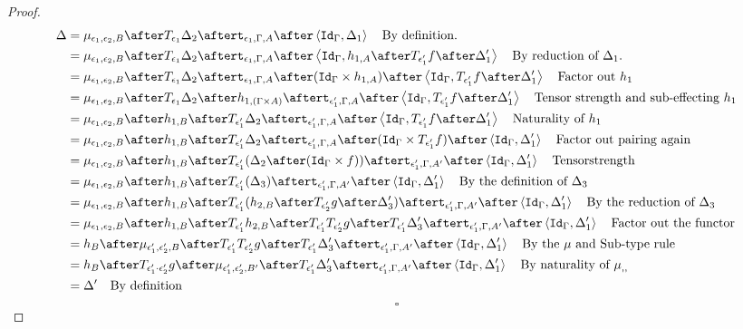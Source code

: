 \documentclass{Report}
\begin{document}
\begin{proof}
    \begin{align}
        \D &= \bind{\e_1}{\e_2}{B}\after \T{\e_1}{\D_2}\after\tstrength{\e_1}{\G}{A}\after\pr{\idg}{\D_1}\qt{By definition.}\\
        &= \bind{\e_1}{\e_2}{B}\after \T{\e_1}{\D_2}\after\tstrength{\e_1}{\G}{A}\after\pr{\idg}{h_{1, A}\after\T{\e_1'}{f}\after\D_1'}\qt{By reduction of $\D_1$.}\\
        &= \bind{\e_1}{\e_2}{B}\after \T{\e_1}{\D_2}\after\tstrength{\e_1}{\G}{A}\after(\idg\times h_{1, A})\after\pr{\idg}{\T{\e_1'}{f}\after\D_1'}\qt{Factor out $h_1$}\\
        &= \bind{\e_1}{\e_2}{B}\after \T{\e_1}{\D_2}\after
        h_{1, (\G\times A)}\after
        \tstrength{\e_1'}{\G}{A}\after\pr{\idg}{\T{\e_1'}{f}\after\D_1'}\qt{Tensor strength and sub-effecting $h_1$}\\
        &= \bind{\e_1}{\e_2}{B}\after 
        h_{1, B}\after\T{\e_1'}{\D_2}\after
        \tstrength{\e_1'}{\G}{A}\after\pr{\idg}{\T{\e_1'}{f}\after\D_1'}\qt{Naturality of $h_1$}\\
        &= \bind{\e_1}{\e_2}{B}\after 
        h_{1, B}\after\T{\e_1'}{\D_2}\after
        \tstrength{\e_1'}{\G}{A}\after(\idg\times \T{\e_1'}{f})\after\pr{\idg}{\D_1'}\qt{Factor out pairing again}\\
        &= \bind{\e_1}{\e_2}{B}\after 
        h_{1, B}\after\T{\e_1'}{(\D_2\after(\idg\times f))}\after
        \tstrength{\e_1'}{\G}{A'}\after\pr{\idg}{\D_1'}\qt{Tensorstrength}\\
        &= \bind{\e_1}{\e_2}{B}\after 
        h_{1, B}\after\T{\e_1'}{(\D_3)}\after
        \tstrength{\e_1'}{\G}{A'}\after\pr{\idg}{\D_1'}\qt{By the definition of $\D_3$}\\
        &= \bind{\e_1}{\e_2}{B}\after 
        h_{1, B}\after\T{\e_1'}{(h_{2, B}\after\T{\e_2'}{g}\after \D_3')}\after
        \tstrength{\e_1'}{\G}{A'}\after\pr{\idg}{\D_1'}\qt{By the reduction of $\D_3$}\\
        &= \bind{\e_1}{\e_2}{B}\after 
        h_{1, B}\after\T{\e_1'}{h_{2, B}}\after\T{\e_1'}{\T{\e_2'}{g}}\after \T{\e_1'}{\D_3'}\after
        \tstrength{\e_1'}{\G}{A'}\after\pr{\idg}{\D_1'}\qt{Factor out the functor}\\
        &= h_B\after\bind{\e_1'}{\e_2'}{B}\after\T{\e_1'}{\T{\e_2'}{g}}\after \T{\e_1'}{\D_3'}\after
        \tstrength{\e_1'}{\G}{A'}\after\pr{\idg}{\D_1'}\qt{By the $\mu$ and Sub-type rule }\\
        & = h_B\after\T{\e_1'\dot\e_2'}{g}\after\bind{\e_1'}{\e_2'}{B'}\after \T{\e_1'}{\D_3'}\after
        \tstrength{\e_1'}{\G}{A'}\after\pr{\idg}{\D_1'}\qt{By naturality of $\bind{}{}{}$ }\\
        & = \D' \qt{By definition}
    \end{align}
    $$\square$$
\end{proof}
\end{document}
